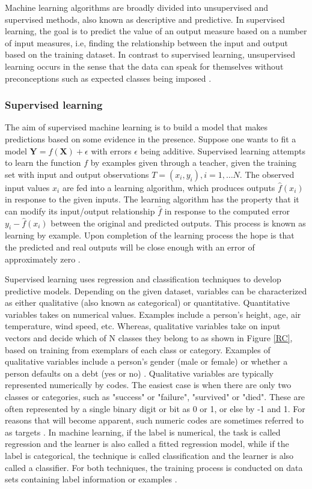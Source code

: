 Machine learning algorithms are broadly divided into unsupervised and supervised methods, also known as descriptive and predictive. In supervised learning, the goal is to predict the value of an output measure based on a number of input measures, i.e, finding the relationship between the input and output based on the training dataset. In contrast to supervised learning, unsupervised learning occurs in the sense that the data can speak for themselves
without preconceptions such as expected classes being imposed \citep{ball2010data}. 

\subsubsection{Supervised learning}
The aim of supervised machine learning is to build a model
that makes predictions based on some evidence in the presence. Suppose  one wants to fit a model $\textbf{Y}=f(\textbf{X})+\epsilon$ with errors $\epsilon$ being additive. Supervised learning attempts to learn the function $f$ by examples given through a teacher, given the training set with input and output observations $T=(x_i,y_i ), i=1,\dots N$. The observed input values $x_i$ are fed into a learning algorithm, which produces outputs $\widehat{f}(x_i)$ in response to the given inputs. The learning algorithm has the property that it can modify its input/output relationship $\widehat{f}$ in response to the computed error $y_i- \widehat{f} (x_i)$ between the original and predicted outputs. This process is known as learning by example. Upon completion of the learning process the hope is that the predicted and real outputs will be close enough with an error of approximately zero \citep{friedman2001elements}.

Supervised learning uses regression and classification techniques
to develop predictive models. Depending on the given dataset, variables can be characterized as either qualitative (also known as categorical) or quantitative. Quantitative variables takes on numerical values. Examples include a person's height, age, air temperature, wind speed, etc. Whereas, qualitative variables take on input vectors and decide which of N classes
they belong to as shown in Figure \ref{RC}, based on training from exemplars of each class or category. Examples of qualitative variables include a person’s gender (male or female) or whether a person defaults on a debt (yes or no) \citep{aitkin2009statistical}. Qualitative variables are typically represented numerically by codes. The easiest case is when there are only two classes or categories, such as "success"
or "failure", "survived" or "died". These are often represented by a single binary digit or bit as 0 or 1, or else by -1 and 1. For reasons that will become apparent, such numeric codes are sometimes referred to as targets \citep{friedman2001elements}. In machine learning, if the label is numerical, the task is called regression and the learner is also called a fitted regression model, while if the label is categorical, the technique is called classification and the learner is also called a classifier. For both techniques, the training process is conducted on data sets containing label information or examples \citep{zhou2012ensemble}.

